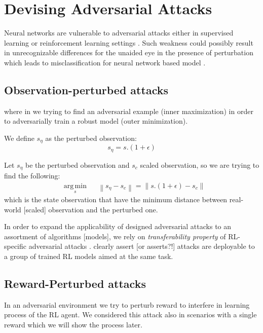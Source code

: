 \documentclass{article}
\DeclareMathOperator*{\argmin}{arg\,min}
\newcommand{\norm}[1]{\left\lVert#1\right\rVert}        %
\begin{document}
    \section{Devising Adversarial Attacks}
    Neural networks are vulnerable to adversarial attacks either in supervised learning or reinforcement learning settings \cite{Huang2017}. Such weakness could possibly result in unrecognizable differences for the unaided eye in the presence of perturbation which leads to misclassification for neural network based model \cite{Szegedy2014, Goodfellow2014}.


    \subsection{Observation-perturbed attacks}


    where in we trying to find an adversarial example (inner maximization) in order to adversarially train a robust model (outer minimization).

    We define $s_\eta$ as the perturbed observation:
    \begin{equation}
        s_\eta = s . (1 + \epsilon)
    \end{equation}


    Let $s_\eta$ be the perturbed observation and $s_c$ scaled observation, so we are trying to find the following:
    \begin{equation}
        \begin{aligned}
            & \underset{s}{\argmin}
            & & {\norm{s_\eta - s_c}} = \norm{s . (1 + \epsilon) - s_c}
        \end{aligned}
    \end{equation}
    which is the state observation that have the minimum distance between real-world [scaled] observation and the perturbed one.

    In order to expand the applicability of designed adversarial attacks to an assortment of algorithms [models], we rely on \textit{transferability property} of RL-specific adversarial attacks \cite{Szegedy2014, Papernot2016, Goodfellow2014a}. \cite{Huang2017} clearly assert [or asserts?!] attacks are deployable to a group of trained RL models aimed at the same task.

    \subsection{Reward-Perturbed attacks}
    In an adversarial environment we try to perturb reward to interfere in learning process of the RL agent. We considered this attack also in scenarios with a single reward which we will show the process later.
\end{document}
